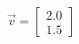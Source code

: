 \documentclass[preview]{standalone}
\begin{document}
\begin{align*}
\vec{v}=\begin{bmatrix}2.0\\1.5\end{bmatrix}
\end{align*}
\end{document}
